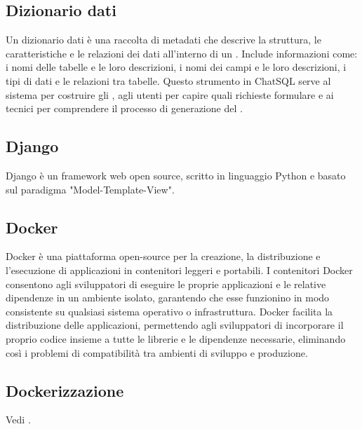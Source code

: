 \vspace{2em}
\subsection*{Dizionario dati}
\par Un dizionario dati è una raccolta di metadati che descrive la struttura, le caratteristiche e le relazioni dei dati all'interno di un . Include informazioni come: i nomi delle tabelle e le loro descrizioni, i nomi dei campi e le loro descrizioni, i tipi di dati e le relazioni tra tabelle. Questo strumento in ChatSQL serve al sistema per costruire gli , agli utenti per capire quali richieste formulare e ai tecnici per comprendere il processo di generazione del .

\vspace{2em}
\subsection*{Django}
\par Django è un framework web open source, scritto in linguaggio Python e basato sul paradigma "Model-Template-View".

\vspace{2em}
\subsection*{Docker}
\par Docker è una piattaforma open-source per la creazione, la distribuzione e l'esecuzione di applicazioni in contenitori leggeri e portabili. I contenitori Docker consentono agli sviluppatori di eseguire le proprie applicazioni e le relative dipendenze in un ambiente isolato, garantendo che esse funzionino in modo consistente su qualsiasi sistema operativo o infrastruttura. Docker facilita la distribuzione delle applicazioni, permettendo agli sviluppatori di incorporare il proprio codice insieme a tutte le librerie e le dipendenze necessarie, eliminando così i problemi di compatibilità tra ambienti di sviluppo e produzione.

\vspace{2em}
\subsection*{Dockerizzazione}
\par Vedi .

\vspace{2em}
